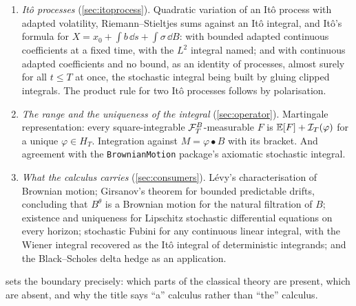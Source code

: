 \documentclass[11pt]{article}
\newcommand{\HT}{H_T}
\newcommand{\bulletB}{\mathbin{\bullet}}
\begin{document}
\begin{enumerate}[label=(\arabic*)]
\item \emph{It\^o processes} (\cref{sec:itoprocess}). Quadratic variation of an It\^o process with adapted
  volatility, Riemann--Stieltjes sums against an It\^o integral, and It\^o's formula for
  $X=x_0+\int b\,\dd s+\int\sigma\,\dd B$: with bounded adapted continuous coefficients at a fixed time, with the
  $L^2$ integral named; and with continuous adapted coefficients and no bound, as an identity of processes, almost
  surely for all $t\le T$ at once, the stochastic integral being built by gluing clipped integrals. The product rule
  for two It\^o processes follows by polarisation.
\item \emph{The range and the uniqueness of the integral} (\cref{sec:operator}). Martingale
  representation: every square-integrable $\mathcal{F}^B_T$-measurable $F$ is $\mathbb{E}[F]+\mathcal{I}_T(\varphi)$ for a
  unique $\varphi\in\HT$. Integration against $M=\varphi\bulletB B$ with its bracket. And agreement with
  the \texttt{BrownianMotion} package's axiomatic stochastic integral.
\item \emph{What the calculus carries} (\cref{sec:consumers}). L\'evy's characterisation of Brownian motion;
  Girsanov's theorem for bounded predictable drifts, concluding that $B^\theta$ is a Brownian motion for the
  natural filtration of $B$; existence and uniqueness for Lipschitz stochastic differential equations on every
  horizon; stochastic Fubini for any continuous linear integral, with the Wiener integral recovered as the
  It\^o integral of deterministic integrands; and the Black--Scholes delta hedge as an application.
\end{enumerate}
 sets the boundary precisely: which parts of the classical theory are present, which are
absent, and why the title says ``a'' calculus rather than ``the'' calculus.
\end{document}

